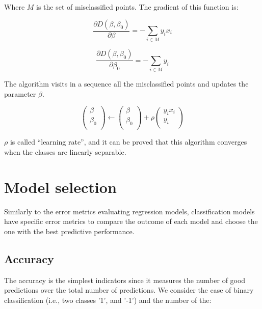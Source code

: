 Where $M$ is the set of misclassified points. The gradient of this function is:

\begin{equation}
        \frac{\partial D\left(\beta,\beta_0\right)}{\partial\beta}=-\sum_{i\in M}{y_ix_i}
        \label{eq_perceptron2}
\end{equation}

\begin{equation}
        \frac{\partial D\left(\beta,\beta_0\right)}{\partial\beta_0}=-\sum_{i\in M} y_i
        \label{eq_perceptron3}
\end{equation}

The algorithm visits in a sequence all the misclassified points and updates the parameter $\beta$.

\begin{equation}
        \left(\begin{matrix}\beta\\\beta_0\\\end{matrix}\right)\gets\left(\begin{matrix}\beta\\\beta_0\\\end{matrix}\right)+\rho\left(\begin{matrix}y_ix_i\\y_i\\\end{matrix}\right)
        \label{eq_perceptron4}
\end{equation}

$\rho$ is called “learning rate”, and it can be proved that this algorithm converges when the classes are linearly separable.

\section{Model selection}
Similarly to the error metrics evaluating regression models, classification models have specific error metrics to compare the outcome of each model and choose the one with the best predictive performance.

\subsection{Accuracy}
The accuracy is the simplest indicators since it measures the number of good predictions over the total number of predictions. We consider the case of binary classification (i.e., two classes '1', and '-1') and the number of the:

